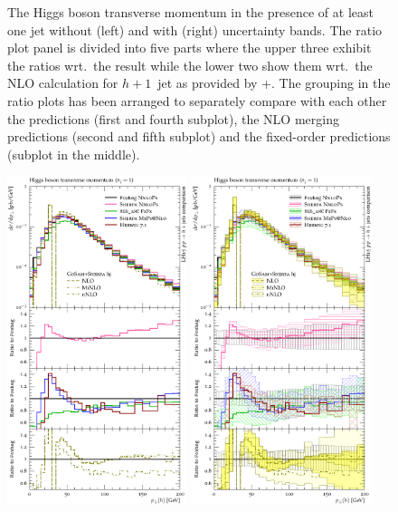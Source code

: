 \begin{figure}[t!]
  \caption{\label{fig:hjetscomp:results:1obs:hpt}%
    The Higgs boson transverse momentum in the presence of at least
    one jet without (left) and with (right) uncertainty bands. The
    ratio plot panel is divided into five parts where the upper three
    exhibit the ratios wrt.~the \Powheg \NNLOPS result while the lower
    two show them wrt.~the NLO calculation for $h+1$~jet as
    provided by \GoSam{}+\Sherpa. The grouping in the ratio plots has
    been arranged to separately compare with each other the \NNLOPS
    predictions (first and fourth subplot), the NLO merging
    predictions (second and fifth subplot) and the fixed-order
    predictions (subplot in the middle).}
\end{figure}

\begin{figure}[t!]
  \includegraphics[width=0.47\textwidth]{figures/hjetscomp_u_H_j_pT_excl.pdf}
  \hfill
  \includegraphics[width=0.47\textwidth]{figures/hjetscomp_H_j_pT_excl.pdf}

\end{figure}
